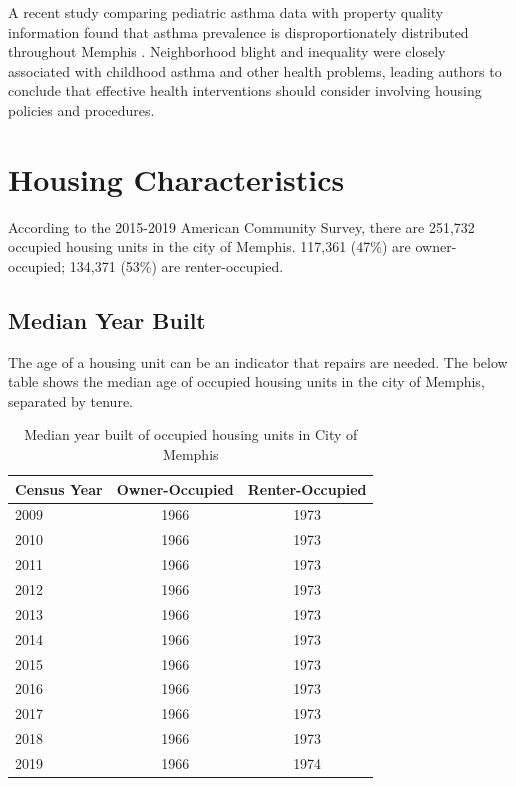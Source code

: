 \documentclass[
]{book}
\begin{document}
A recent study comparing pediatric asthma data with property quality information found that asthma prevalence is disproportionately distributed throughout Memphis \citep{shin2018}. Neighborhood blight and inequality were closely associated with childhood asthma and other health problems, leading authors to conclude that effective health interventions should consider involving housing policies and procedures.

\hypertarget{housing-characteristics}{%
\section{Housing Characteristics}\label{housing-characteristics}}

According to the 2015-2019 American Community Survey, there are 251,732 occupied housing units in the city of Memphis. 117,361 (47\%) are owner-occupied; 134,371 (53\%) are renter-occupied.

\hypertarget{median-year-built}{%
\subsection{Median Year Built}\label{median-year-built}}

The age of a housing unit can be an indicator that repairs are needed. The below table shows the median age of occupied housing units in the city of Memphis, separated by tenure.

\begin{table}

\caption{\label{tab:tbl-medyrbltmem}Median year built of occupied housing units in City of Memphis}
\centering
\begin{tabular}[t]{l|c|c}
\hline
Census Year & Owner-Occupied & Renter-Occupied\\
\hline
2009 & 1966 & 1973\\
\hline
2010 & 1966 & 1973\\
\hline
2011 & 1966 & 1973\\
\hline
2012 & 1966 & 1973\\
\hline
2013 & 1966 & 1973\\
\hline
2014 & 1966 & 1973\\
\hline
2015 & 1966 & 1973\\
\hline
2016 & 1966 & 1973\\
\hline
2017 & 1966 & 1973\\
\hline
2018 & 1966 & 1973\\
\hline
2019 & 1966 & 1974\\
\hline
\end{tabular}
\end{table}
\end{document}
